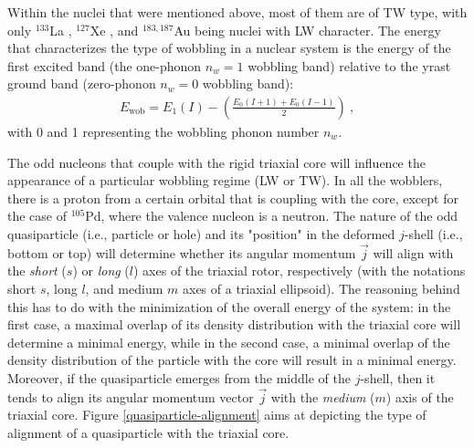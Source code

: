 \documentclass[11pt]{article}
\begin{document}
Within the nuclei that were mentioned above, most of them are of TW type, with only $^{133}$La \cite{biswas2019longitudinal}, $^{127}$Xe \cite{chakraborty2020multiphonon}, and $^{183,187}$Au \cite{nandi2020first,sensharma2020longitudinal} being nuclei with LW character. The energy that characterizes the type of wobbling in a nuclear system is the energy of the first excited band (the one-phonon $n_w=1$ wobbling band) relative to the yrast ground band (zero-phonon $n_w=0$ wobbling band):
\begin{align}
    E_\text{wob}=E_{1}(I)-\left(\frac{E_0(I+1)+E_0(I-1)}{2}\right)\ ,
    \label{wobbling-energy-relative}
\end{align}
with 0 and 1 representing the wobbling phonon number $n_w$.

The odd nucleons that couple with the rigid triaxial core will influence the appearance of a particular wobbling regime (LW or TW). In all the wobblers, there is a proton from a certain orbital that is coupling with the core, except for the case of $^{105}$Pd, where the valence nucleon is a neutron. The nature of the odd quasiparticle (i.e., particle or hole) and its "position" in the deformed $j$-shell (i.e., bottom or top) will determine whether its angular momentum $\vec{j}$ will align with the \emph{short} ($s$) or \emph{long} ($l$) axes of the triaxial rotor, respectively (with the notations short $s$, long $l$, and medium $m$ axes of a triaxial ellipsoid). The reasoning behind this has to do with the minimization of the overall energy of the system: in the first case, a maximal overlap of its density distribution with the triaxial core will determine a minimal energy, while in the second case, a minimal overlap of the density distribution of the particle with the core will result in a minimal energy. Moreover, if the quasiparticle emerges from the middle of the $j$-shell, then it tends to align its angular momentum vector $\vec{j}$ with the \emph{medium} ($m$) axis of the triaxial core. Figure \ref{quasiparticle-alignment} aims at depicting the type of alignment of a quasiparticle with the triaxial core.
\end{document}
